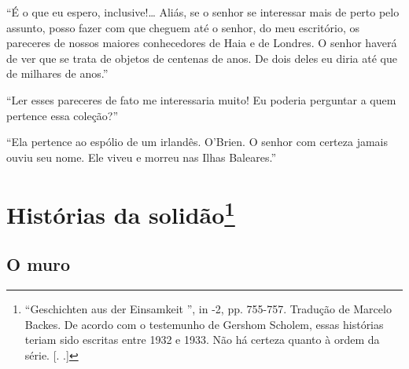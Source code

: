 ``É o que eu espero, inclusive!\ldots{} Aliás, se o senhor se interessar mais
de perto pelo assunto, posso fazer com que cheguem até o senhor, do meu
escritório, os pareceres de nossos maiores conhecedores de Haia e de
Londres. O senhor haverá de ver que se trata de objetos de centenas de
anos. De dois deles eu diria até que de milhares de anos.''

``Ler esses pareceres de fato me interessaria muito! Eu poderia
perguntar a quem pertence essa coleção?''

``Ela pertence ao espólio de um irlandês. O'Brien. O senhor com certeza
jamais ouviu seu nome. Ele viveu e morreu nas Ilhas Baleares.''

\chapter{Histórias da solidão\footnote[*]{``Geschichten aus der Einsamkeit '', in 
  -2, pp. 755-757. Tradução de Marcelo Backes. De acordo com o
  testemunho de Gershom Scholem, essas histórias teriam sido escritas
  entre 1932 e 1933. Não há certeza quanto à ordem da série. [. .]} }

\section{O muro}

